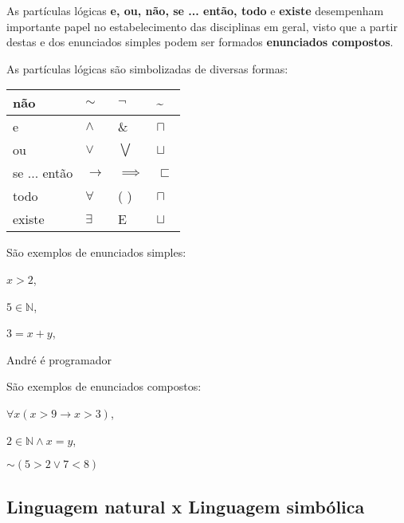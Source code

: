 \documentclass[
	14pt,				%
	twoside,			%
	a4paper,			%
	english,			%
	french,				%
	spanish,			%
	brazil,				%
    ]{abntex2}
\begin{document}
As partículas lógicas \textbf{e, ou, não, se ... então, todo} e \textbf{existe} desempenham importante papel no estabelecimento das disciplinas em geral, visto que a partir destas e dos enunciados simples podem ser formados \textbf{enunciados compostos}.

As partículas lógicas são simbolizadas de diversas formas:

\bigskip
\begin{center}
    \large
    \begin{tabular}{l l l l}
        não          & $\sim$   & $\neg$  & \textasciitilde \\ \hline
        e            & $\wedge$ & \& & $\sqcap$ \\ \hline
        ou           & $\vee$   & $\bigvee$  & $\sqcup$ \\ \hline
        se ... então & $\rightarrow$ & $\implies$ & $\sqsubset$  \\ \hline
        todo         & $\forall$  & \small( \small) & \LARGE{$\sqcap$} \\ \hline
        existe       & $\exists$ & E & \LARGE{$\sqcup$}  \\ \hline
    \end{tabular}
\end{center}

\bigskip \noindent
São exemplos de enunciados simples:

\hskip 2.6cm $x > 2$,

\hskip 2.5cm $5 \in \mathbb{N}$,

\hskip 2.5cm $ 3 = x + y$,

\hskip 2.5cm André é programador

\bigskip \noindent
São exemplos de enunciados compostos:

\hskip 2.5cm $\forall x(x > 9 \to x > 3)$,


\hskip 2.5cm $2 \in \mathbb{N} \wedge x = y$,

\hskip 2.5cm $\sim(5 > 2 \vee 7 < 8)$

\newpage

\subsection*{Linguagem natural x Linguagem simbólica}
\end{document}

